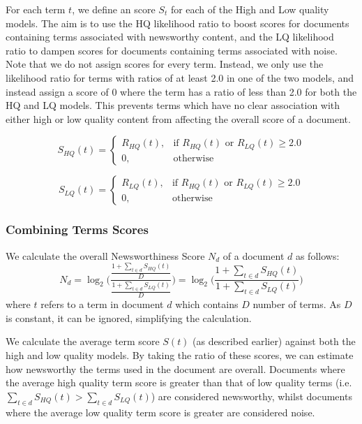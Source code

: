 For each term \(t\), we define an score \(S_t\) for each of the High and Low quality models. The aim is to use the HQ likelihood ratio to boost scores for documents containing terms associated with newsworthy content, and the LQ likelihood ratio to dampen scores for documents containing terms associated with noise.
Note that we do not assign scores for every term.
Instead, we only use the likelihood ratio for terms with ratios of at least 2.0 in one of the two models, and instead assign a score of 0 where the term has a ratio of less than 2.0 for both the HQ and LQ models.
This prevents terms which have no clear association with either high or low quality content from affecting the overall score of a document.

\begin{equation}
	S_{HQ}(t) =
	\begin{cases}
    R_{HQ}(t) ,& \text{if } R_{HQ}(t) \text{ or } R_{LQ}(t) \geq 2.0\\
    0,              & \text{otherwise}
	\end{cases}
\end{equation}

\begin{equation}
	S_{LQ}(t) =
	\begin{cases}
    R_{LQ}(t),& \text{if } R_{HQ}(t) \text{ or } R_{LQ}(t) \geq 2.0\\
    0,              & \text{otherwise}
	\end{cases}
\end{equation}

\subsubsection{Combining Terms Scores}
We calculate the overall Newsworthiness Score \(N_d\) of a document \(d\) as follows:
\begin{equation}
	N_d =
	\log_2\Bigg({\frac{
		\frac{
			1 + \sum_{t \in d}{S_{HQ}(t)}
		}{
			D
		}
	}{
		\frac{
			1 + \sum_{t \in d}{S_{LQ}(t)}
		}{
			D
		}
	}}\Bigg)
	=
	\log_2\bigg({\frac{
		1 + \sum_{t \in d}{S_{HQ}(t)}
	}{
		1 + \sum_{t \in d}{S_{LQ}(t)}
	}}\bigg)
\end{equation}
where \(t\) refers to a term in document \(d\) which contains \(D\) number of terms. As \(D\) is constant, it can be ignored, simplifying the calculation.

We calculate the average term score \(S(t)\) (as described earlier) against both the high and low quality models.
By taking the ratio of these scores, we can estimate how newsworthy the terms used in the document are overall.
Documents where the average high quality term score is greater than that of low quality terms (i.e. \( \sum_{t \in d}{S_{HQ}(t)} > \sum_{t \in d}{S_{LQ}(t)} \)) are considered newsworthy, whilst documents where the average low quality term score is greater are considered noise.

